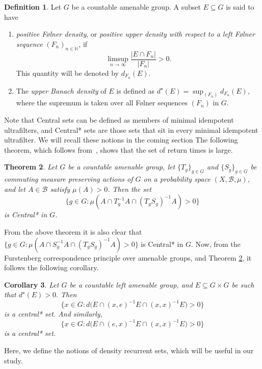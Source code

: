 \documentclass{article}
\theoremstyle{Theorem}
\newtheorem{thm}{Theorem}[section]
\newtheorem{cor}[thm]{Corollary}
\theoremstyle{definition}
\newtheorem{defn}[thm]{Definition}
\begin{document}
\begin{defn}
Let $G$ be a countable amenable group. A subset $E \subseteq G$ is said to have

\begin{enumerate}
\item \emph{positive Følner density}, or \emph{positive upper density with respect to
a left Følner sequence} $(F_n)_{n \in \mathbb{N}}$, if
\[
\limsup_{n \to \infty} \frac{|E \cap F_n|}{|F_n|} > 0.
\]
This quantity will be denoted by $d_{F_n}(E)$.

\item The \emph{upper Banach density} of $E$ is defined as $d^\star (E)=\sup_{(F_n)}d_{F_n}(E),$
where the supremum is taken over all Følner sequences $(F_n)$ in $G$.
\end{enumerate}

\end{defn}

Note that Central sets can be defined as members of minimal idempotent ultrafilters, and Central* sets are those sets that sit in every minimal idempotent ultrafilter. We will recall these notions in the coming section
The following theorem, which follows from~\cite[Theorem 1.4]{BM}, shows that the set of return times
is large. 

\begin{thm}\label{measure}
Let $G$ be a countable amenable group, let $\{T_g\}_{g \in G}$ and
$\{S_g\}_{g \in G}$ be commuting measure preserving actions of $G$ on a
probability space $(X,\mathcal{B},\mu)$, and let $A \in \mathcal{B}$ satisfy
$\mu(A) > 0$. Then the set
\[
\{ g \in G : \mu(A \cap T_g^{-1}A \cap (T_g S_g)^{-1}A) > 0 \}
\]
is Central* in $G$.
\end{thm}

From the above theorem it is also clear that $\{ g \in G : \mu(A \cap S_g^{-1}A \cap (T_g S_g)^{-1}A) > 0 \}$ is Central* in $G$. Now, from the Furstenberg correspondence principle over amenable groups, and Theorem \ref{measure}, it follows the following corollary.

\begin{cor}\label{corfirst}
   Let $G$ be a countable left amenable group, and $E\subseteq G\times G$ be such that $d^\star (E)>0.$ Then 
\[
\{x\in G: d\bigl(E \cap (x,e)^{-1}E \cap (x,x)^{-1}E\bigr) > 0\}
\]
is a central* set. And similarly,
\[
\{x\in G: d\bigl(E \cap (e,x)^{-1}E \cap (x,x)^{-1}E\bigr) > 0\}
\]
is a central* set.
\end{cor}

Here, we define the notions of density recurrent sets, which will be useful in our study.
\end{document}
